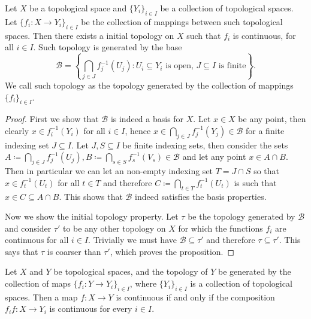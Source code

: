 \begin{proposition}
\label{prop: top generated by collection of maps}
Let \(X\) be a topological space and \(\{Y_i\}_{i \in I}\) be a collection of
topological spaces. Let \(\{f_i : X \to Y_i\}_{i \in I}\) be the collection of
mappings between such topological spaces. Then there exists a initial
topology on \(X\) such that \(f_i\) is continuous, for all \(i \in I\). Such
topology is generated by the base
\[
  \mathcal B = \left\{ \bigcap_{j \in J} f_j^{-1}(U_j) : U_i \subseteq Y_i
  \text{ is open, } J \subseteq I \text{ is finite}\right\}.
\]
We call such topology as the topology generated by the collection of mappings
\(\{f_i\}_{i \in I}\).
\end{proposition}

\begin{proof}
First we show that \(\mathcal B\) is indeed a basis for \(X\). Let \(x \in X\)
be any point, then clearly \(x \in f_i^{-1}(Y_i)\) for all \(i \in I\), hence
\(x \in \bigcap_{j \in  J} f_j^{-1}(Y_j) \in \mathcal B\) for a finite
indexing set \(J \subseteq I\).
Let \(J, S \subseteq I\) be finite indexing sets, then consider the sets
\(A \coloneq \bigcap_{j \in J} f_j^{-1}(U_j), B \coloneq \bigcap_{s \in S} f_s^{-1}(V_s) \in
\mathcal B\) and let any point \(x \in A \cap B\). Then in particular we can
let an non-empty indexing set \(T = J \cap S\) so that \(x \in f_t^{-1}(U_t)\)
for all \(t \in T\) and therefore \(C \coloneq \bigcap_{t \in  T} f_t^{-1}(U_t)\) is
such that \(x \in C \subseteq A \cap B\). This shows that \(\mathcal B\)
indeed satisfies the basis properties.

Now we show the initial topology property. Let \(\tau\) be the topology
generated by \(\mathcal B\) and consider \(\tau'\) to be any other
topology on \(X\) for which the functions \(f_i\) are continuous for all \(i
\in I\). Trivially we must have \(\mathcal B \subseteq \tau'\) and
therefore \(\tau \subseteq \tau'\). This says that \(\tau\)
is coarser than \(\tau'\), which proves the proposition.
\end{proof}

\begin{proposition}
Let \(X\) and \(Y\) be topological spaces, and the topology of \(Y\) be
generated by the collection of maps \(\{f_i : Y \to Y_i\}_{i \in I}\), where
\(\{Y_i\}_{i \in I}\) is a collection of topological spaces. Then a map \(f :
X \to Y\) is continuous if and only if the composition \(f_i f : X \to
Y_i\) is continuous for every \(i \in I\).
\end{proposition}

